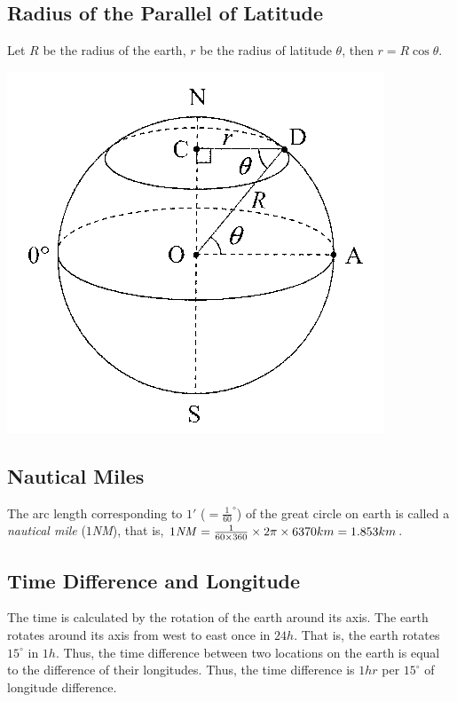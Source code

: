 \documentclass{report}
\begin{document}
\begin{multicols}{2}
    \subsection*{Radius of the Parallel of Latitude}

    Let $R$ be the radius of the earth, $r$ be the radius of latitude $\theta$,
    then $r = R \cos \theta$.
    \begin{center}
        \includegraphics[scale=1.3]{radius of latitude.png}
    \end{center}

    \subsection*{Nautical Miles}

    The arc length corresponding to $1'$ ($=\frac{1}{60}^\circ$) of the great
    circle on earth is called a \emph{nautical mile} ($1$\emph{NM}), that is,
    $1\text{\emph{NM}} = \frac{1}{60 \times 360} \times 2\pi \times 6370km =
        1.853km$.

    \subsection*{Time Difference and Longitude}

    The time is calculated by the rotation of the earth around its axis. The earth
    rotates around its axis from west to east once in $24h$. That is, the earth
    rotates $15^\circ$ in $1h$. Thus, the time difference between two locations on
    the earth is equal to the difference of their longitudes. Thus, the time
    difference is $1hr$ per $15^\circ$ of longitude difference.


\end{multicols}
\end{document}
